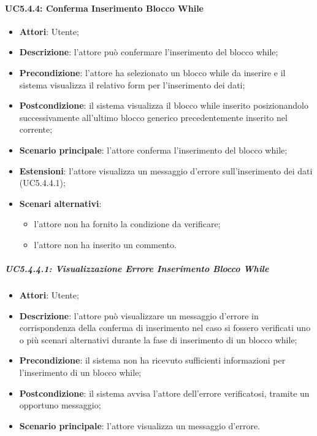 \paragraph{UC5.4.4: Conferma Inserimento Blocco While}
\label{UC5.4.4}
\begin{itemize}
	\item \textbf{Attori}: Utente;
	\item \textbf{Descrizione}: l'attore può confermare l'inserimento del blocco while;
	\item \textbf{Precondizione}: l'attore ha selezionato un blocco while da inserire e il sistema visualizza il relativo form per l'inserimento dei dati;
	\item \textbf{Postcondizione}: il sistema visualizza il blocco while inserito posizionandolo successivamente all'ultimo blocco generico precedentemente inserito nel  corrente;
	\item \textbf{Scenario principale}: l'attore conferma l'inserimento del blocco while;
	\item \textbf{Estensioni}: l'attore visualizza un messaggio d'errore sull'inserimento dei dati (UC5.4.4.1);
	\item \textbf{Scenari alternativi}:
	\begin{itemize}
		\item l'attore non ha fornito la condizione da verificare;
		\item l'attore non ha inserito un commento.
	\end{itemize}
\end{itemize}

\subparagraph{UC5.4.4.1: Visualizzazione Errore Inserimento Blocco While}
\label{UC5.4.4.1}
\begin{itemize}
	\item \textbf{Attori}: Utente;
	\item \textbf{Descrizione}: l'attore può visualizzare un messaggio d'errore in corrispondenza della conferma di inserimento nel caso si fossero verificati uno o più scenari alternativi durante la fase di inserimento di un blocco while;
	\item \textbf{Precondizione}: il sistema non ha ricevuto sufficienti informazioni per l'inserimento di un blocco while;
	\item \textbf{Postcondizione}: il sistema avvisa l'attore dell'errore verificatosi, tramite un opportuno messaggio;
	\item \textbf{Scenario principale}: l'attore visualizza un messaggio d'errore.
\end{itemize}

